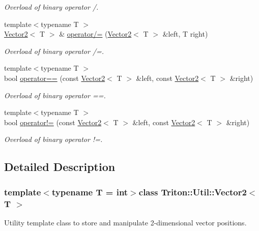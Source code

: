 \begin{DoxyCompactItemize}
\begin{DoxyCompactList}\small\item\em Overload of binary operator /. \end{DoxyCompactList}\item 
{\footnotesize template$<$typename T $>$ }\\\hyperlink{class_triton_1_1_util_1_1_vector2}{Vector2}$<$ T $>$ \& \hyperlink{class_triton_1_1_util_1_1_vector2_ac4d293c9dc7954ccfd5e373972f38b03}{operator/=} (\hyperlink{class_triton_1_1_util_1_1_vector2}{Vector2}$<$ T $>$ \&left, T right)
\begin{DoxyCompactList}\small\item\em Overload of binary operator /=. \end{DoxyCompactList}\item 
{\footnotesize template$<$typename T $>$ }\\bool \hyperlink{class_triton_1_1_util_1_1_vector2_a9a7b2d36c3850828fdb651facfd25136}{operator==} (const \hyperlink{class_triton_1_1_util_1_1_vector2}{Vector2}$<$ T $>$ \&left, const \hyperlink{class_triton_1_1_util_1_1_vector2}{Vector2}$<$ T $>$ \&right)
\begin{DoxyCompactList}\small\item\em Overload of binary operator ==. \end{DoxyCompactList}\item 
{\footnotesize template$<$typename T $>$ }\\bool \hyperlink{class_triton_1_1_util_1_1_vector2_a01673da35ef9c52d0e54b8263549a956}{operator!=} (const \hyperlink{class_triton_1_1_util_1_1_vector2}{Vector2}$<$ T $>$ \&left, const \hyperlink{class_triton_1_1_util_1_1_vector2}{Vector2}$<$ T $>$ \&right)
\begin{DoxyCompactList}\small\item\em Overload of binary operator !=. \end{DoxyCompactList}\end{DoxyCompactItemize}


\subsection{Detailed Description}
\subsubsection*{template$<$typename T = int$>$class Triton\+::\+Util\+::\+Vector2$<$ T $>$}

Utility template class to store and manipulate 2-\/dimensional vector positions. 

